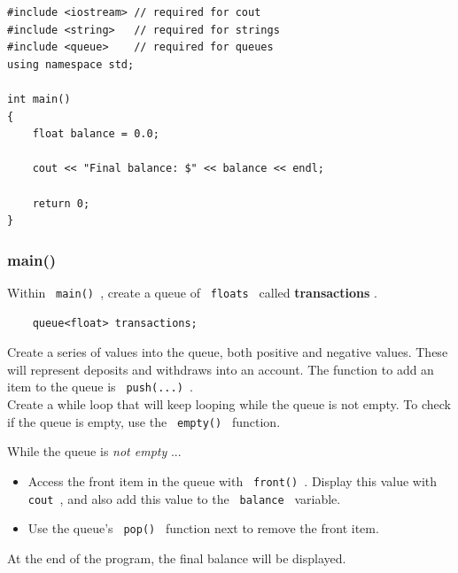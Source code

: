 \documentclass[a4paper,12pt]{book}
\begin{document}
\begin{lstlisting}[style=code]
#include <iostream> // required for cout
#include <string>   // required for strings
#include <queue>    // required for queues
using namespace std;

int main()
{
    float balance = 0.0;

    cout << "Final balance: $" << balance << endl;
    
    return 0;
}
\end{lstlisting}

                \hrulefill{}
                \subsubsection*{ main() }

                    Within \texttt{ main() }, create a queue of \texttt{ floats }
                    called \textbf{ transactions }.

\begin{verbatim}
    queue<float> transactions;
\end{verbatim}

                    Create a series of values into the queue, both positive
                    and negative values. These will represent deposits and
                    withdraws into an account. The function to add an
                    item to the queue is \texttt{ push(...) }. \\

                    Create a while loop that will keep looping while
                    the queue is not empty. To check if the queue is
                    empty, use the \texttt{ empty() } function.
                    
                    While the queue is \textit{ not empty }...

                    \begin{itemize}
                        \item Access the front item in the queue with \texttt{ front() }.
                        Display this value with \texttt{ cout }, and also
                        add this value to the \texttt{ balance } variable.
                        \item Use the queue's \texttt{ pop() } function next
                        to remove the front item.
                    \end{itemize}

                    At the end of the program, the final balance will be displayed.
\end{document}
